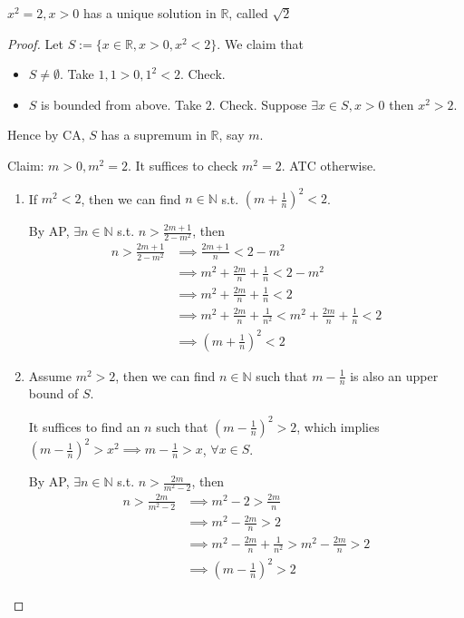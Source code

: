 \begin{result}[Implication of CA]
    $x^2 = 2, x > 0$ has a unique solution in $\mathbb{R}$, called $\sqrt{2}$
\end{result}

\begin{proof}
    Let $S:= \{ x \in \mathbb{R}, x > 0, x^2 < 2\} $. 
    We claim that 
    \begin{itemize}
        \item $S \neq \emptyset$. Take $1, 1 > 0, 1^2 < 2$. Check.
        \item $S$ is bounded from above. Take $2$. Check.
Suppose $\exists x \in S, x > 0$ then $x^2 > 2$. 
    \end{itemize} 
    Hence by CA, $S$ has a supremum in $\mathbb{R}$, 
    say $m$. 
    \medskip 

    Claim: $m > 0, m^2 = 2$. It suffices to check $m^2 = 2$.
    ATC otherwise.
    \begin{enumerate}
        \item If $m^2 < 2$, 
then we can find $n \in \mathbb{N}$
s.t. $ \left( m + \frac{1}{n} \right)^2 < 2 $.
\medskip

By AP, $\exists n \in \mathbb{N}$ s.t. 
$n > \frac{2m + 1}{2-m^2}$, then 
\begin{align*}
    n > \frac{2m + 1}{2 - m^2} & \implies \frac{2m + 1}{n} < 2 - m^2 \\
    & \implies m^2 + \frac{2m}{n} + \frac{1}{n} < 2 - m^2 \\
    & \implies m^2 + \frac{2m}{n} + \frac{1}{n} < 2 \\
    & \implies m^2 + \frac{2m}{n} + \frac{1}{n^2} < m^2 + \frac{2m}{n} + \frac{1}{n} < 2 \\
    & \implies \left( m + \frac{1}{n} \right)^2 < 2
\end{align*}
        \item Assume $m^2 > 2$, then we can find $n \in \mathbb{N}$ 
such that $m - \frac{1}{n}$ is also an upper bound of $S$.
\medskip 

It suffices to find an $n$ such that $ \left( m - \frac{1}{n} \right)^2 > 2 $, 
which implies $ \left( m - \frac{1}{n} \right)^2 > x^2 \implies m - \frac{1}{n}> x$, 
$\forall x \in S$. 
\medskip 

By AP, $\exists n \in \mathbb{N}$ s.t. 
$n > \frac{2m}{m^2 - 2}$, then 
\begin{align*}
    n > \frac{2m}{m^2 - 2} & \implies m^2 - 2 > \frac{2m}{n} \\
    & \implies m^2 - \frac{2m}{n} > 2 \\
    & \implies m^2 - \frac{2m}{n} + \frac{1}{n^2} > m^2 - \frac{2m}{n} > 2 \\
    & \implies  \left(  m - \frac{1}{n} \right)^2 > 2
\end{align*}
    \end{enumerate} 
\end{proof}

